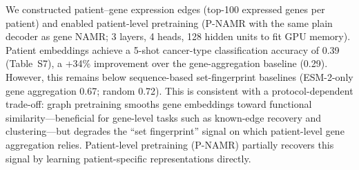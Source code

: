 \documentclass[11pt,a4paper]{article}
\begin{document}
We constructed patient--gene expression edges (top-100 expressed genes per patient) and enabled patient-level pretraining (P-NAMR with the same plain decoder as gene NAMR; 3 layers, 4 heads, 128 hidden units to fit GPU memory). Patient embeddings achieve a 5-shot cancer-type classification accuracy of 0.39 (Table~S7), a +34\% improvement over the gene-aggregation baseline (0.29). However, this remains below sequence-based set-fingerprint baselines (ESM-2-only gene aggregation 0.67; random 0.72). This is consistent with a protocol-dependent trade-off: graph pretraining smooths gene embeddings toward functional similarity---beneficial for gene-level tasks such as known-edge recovery and clustering---but degrades the ``set fingerprint'' signal on which patient-level gene aggregation relies. Patient-level pretraining (P-NAMR) partially recovers this signal by learning patient-specific representations directly.
\end{document}

